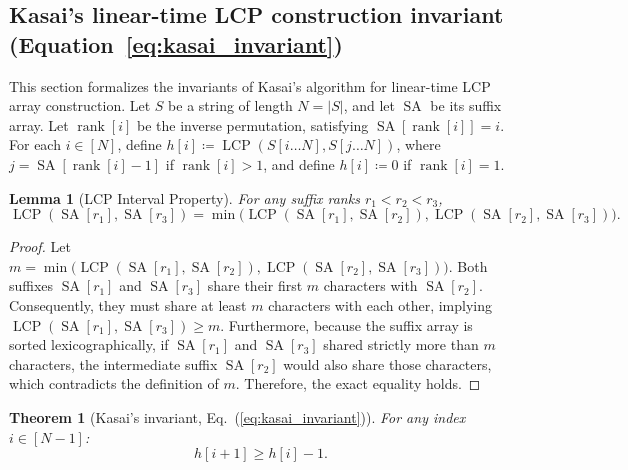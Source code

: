 \documentclass[11pt, letterpaper]{article}
\newtheorem{lemma}{Lemma}[section]
\newtheorem{theorem}{Theorem}[section]
\begin{document}
\subsection{Kasai's linear-time LCP construction invariant (\texorpdfstring{Equation~\ref{eq:kasai_invariant}}{Eq. 9})}
This section formalizes the invariants of Kasai's algorithm \cite{kasai2001linear} for linear-time LCP array construction.
Let $S$ be a string of length $N = |S|$, and let $\operatorname{SA}$ be its suffix array. Let $\operatorname{rank}[i]$ be the inverse permutation, satisfying $\operatorname{SA}[\operatorname{rank}[i]] = i$.
For each $i \in [N]$, define $h[i] \coloneqq \operatorname{LCP}(S[i \dots N], S[j \dots N])$, where $j = \operatorname{SA}[\operatorname{rank}[i] - 1]$ if $\operatorname{rank}[i] > 1$, and define $h[i] \coloneqq 0$ if $\operatorname{rank}[i] = 1$.

\begin{lemma}[LCP Interval Property]\label{lemma:lcp_interval}
For any suffix ranks $r_1 < r_2 < r_3$,
\begin{equation}
    \operatorname{LCP}(\operatorname{SA}[r_1], \operatorname{SA}[r_3]) = \min\big( \operatorname{LCP}(\operatorname{SA}[r_1], \operatorname{SA}[r_2]), \operatorname{LCP}(\operatorname{SA}[r_2], \operatorname{SA}[r_3]) \big).
\end{equation}
\end{lemma}

\begin{proof}
Let $m = \min\big( \operatorname{LCP}(\operatorname{SA}[r_1], \operatorname{SA}[r_2]), \operatorname{LCP}(\operatorname{SA}[r_2], \operatorname{SA}[r_3]) \big)$. Both suffixes $\operatorname{SA}[r_1]$ and $\operatorname{SA}[r_3]$ share their first $m$ characters with $\operatorname{SA}[r_2]$. Consequently, they must share at least $m$ characters with each other, implying $\operatorname{LCP}(\operatorname{SA}[r_1], \operatorname{SA}[r_3]) \ge m$. Furthermore, because the suffix array is sorted lexicographically, if $\operatorname{SA}[r_1]$ and $\operatorname{SA}[r_3]$ shared strictly more than $m$ characters, the intermediate suffix $\operatorname{SA}[r_2]$ would also share those characters, which contradicts the definition of $m$. Therefore, the exact equality holds.
\end{proof}

\begin{theorem}[Kasai's invariant, Eq.~(\ref{eq:kasai_invariant})]
For any index $i \in [N-1]$:
\begin{equation}
    h[i+1] \ge h[i] - 1.
\end{equation}
\end{theorem}
\end{document}
